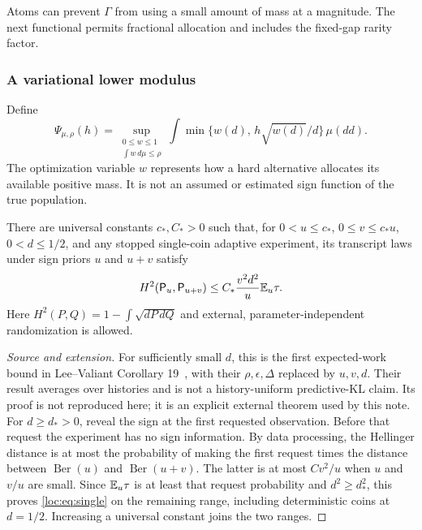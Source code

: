 Atoms can prevent $\Gamma$ from using a small amount of mass at a magnitude. The next functional permits fractional allocation and includes the fixed-gap rarity factor.

\subsubsection{A variational lower modulus}
Define
\begin{equation}\label{loc:eq:Psi}
 \Psi_{\mu,\rho}(h)=
 \sup_{\substack{0\le w\le1\\\int w\,d\mu\le\rho}}
 \int\min\{w(d),\,h\sqrt{w(d)}/d\}\,\mu(dd).
\end{equation}
The optimization variable $w$ represents how a hard alternative allocates its available positive mass. It is not an assumed or estimated sign function of the true population.

\begin{lemma}\label{loc:lem:LV}
There are universal constants $c_*,C_*>0$ such that, for $0<u\le c_*$, $0\le v\le c_*u$, $0<d\le1/2$, and any stopped single-coin adaptive experiment, its transcript laws under sign priors $u$ and $u+v$ satisfy
\begin{equation}\label{loc:eq:single}
 H^2(\mathsf P_u,\mathsf P_{u+v})\le
 C_*\frac{v^2d^2}{u}\mathbb E_u\tau.
\end{equation}
Here $H^2(P,Q)=1-\int\sqrt{dP\,dQ}$ and external, parameter-independent randomization is allowed.
\end{lemma}
\begin{proof}[Source and extension]
For sufficiently small $d$, this is the first expected-work bound in Lee--Valiant Corollary 19~\cite{leevaliant}, with their $\rho,\epsilon,\Delta$ replaced by $u,v,d$. Their result averages over histories and is not a history-uniform predictive-KL claim. Its proof is not reproduced here; it is an explicit external theorem used by this note.
For $d\ge d_*>0$, reveal the sign at the first requested observation. Before that request the experiment has no sign information. By data processing, the Hellinger distance is at most the probability of making the first request times the distance between $\operatorname{Ber}(u)$ and $\operatorname{Ber}(u+v)$. The latter is at most $C v^2/u$ when $u$ and $v/u$ are small. Since $\mathbb E_u\tau$ is at least that request probability and $d^2\ge d_*^2$, this proves \eqref{loc:eq:single} on the remaining range, including deterministic coins at $d=1/2$. Increasing a universal constant joins the two ranges.
\end{proof}

